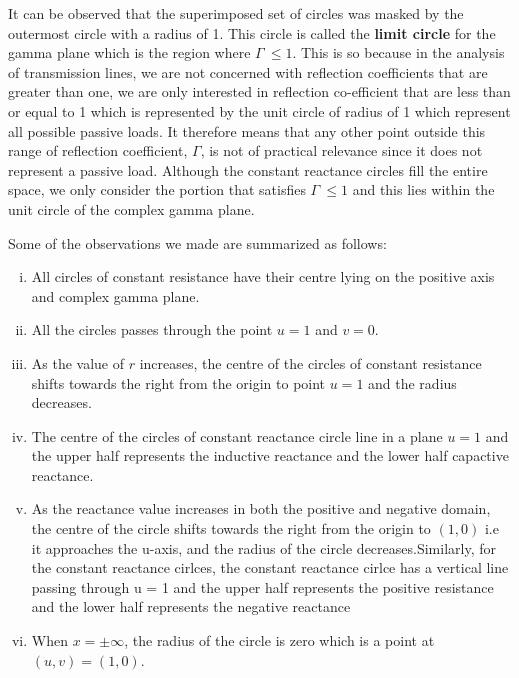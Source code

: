 It can be observed that the superimposed set of circles was masked by the outermost circle with a radius of 1. This circle is called the \textbf{limit circle} for the gamma plane which is the region where $\Gamma\ \leq 1$. This is so because in the analysis of transmission lines, we are not concerned with reflection coefficients that are greater than one, we are only interested in reflection co-efficient that are less than or equal to 1 which is represented by the unit circle of radius of 1 which represent all possible passive loads. It therefore means that any other point outside this range of reflection coefficient, $\Gamma$, is not of practical relevance since it does not represent a passive load. Although the constant reactance circles fill the entire space, we only consider the portion that satisfies $ \Gamma\ \leq 1$ and this lies within the unit circle of the complex gamma plane.

Some of the observations we made are summarized as follows:
\begin{enumerate}[(i)]
\item All circles of constant resistance have their centre lying on the positive axis and complex gamma plane.
\item All the circles passes through the point $u = 1$ and $v = 0$.
\item As the value of $r$ increases, the centre of the circles of constant resistance shifts towards the right from the origin to point $u = 1$ and the radius decreases.
\item The centre of the circles of constant reactance circle line in a plane $u = 1$ and the upper half represents the inductive reactance and the lower half capactive reactance.
\item As the reactance value increases in both the positive and negative domain, the centre of the circle shifts towards the right from the origin to  $(1, 0)$ i.e it approaches the u-axis, and the radius of the circle decreases.Similarly, for the constant reactance cirlces, the constant reactance cirlce has a vertical line passing through u = 1 and the upper half represents the positive resistance and the lower half represents the negative reactance
\item When $x = \pm\infty$, the radius of the circle is zero which is a point at $(u,v) = (1,0)$.
\end{enumerate}

